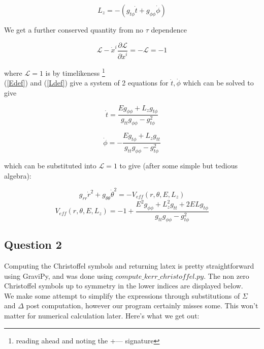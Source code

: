 \documentclass[10pt,a4paper]{report}
\begin{document}
\begin{equation}
L_z = - ( g_{t\phi}\dot{t}+g_{\phi\phi}\dot{\phi})
\label{Ldef}
\end{equation}

We get a further conserved quantity from no $\tau$ dependence

\begin{equation}
\mathcal{L} - \dot{x}^i \frac{\partial \mathcal{L}}{\partial \dot{x}^i} = -\mathcal{L} = -1
\label{Qdef}
\end{equation}

where $\mathcal{L} = 1$ is by timelikeness \footnote{reading ahead and noting the +--- signature} \\

(\ref{Edef}) and (\ref{Ldef}) give a system of 2 equations for $\dot{t}, \dot{\phi}$ which can be solved to give

\begin{equation}
\dot{t} = \frac{Eg_{\phi\phi}+L_zg_{t\phi}}{g_{tt}g_{\phi\phi}-g_{t\phi}^2}
\end{equation}

\begin{equation}
\dot{\phi} = -\frac{Eg_{t\phi}+L_zg_{tt}}{g_{tt}g_{\phi\phi}-g_{t\phi}^2}
\end{equation}

which can be substituted into $\mathcal{L}=1$  to give (after some simple but tedious algebra): 

\begin{equation}
g_{rr}\dot{r}^2+g_{\theta\theta}\dot{\theta}^2 = -V_{eff}(r, \theta, E, L_z)
\label{effpot}
\end{equation}
\begin{equation*}
V_{eff}(r, \theta, E, L_z) = -1 + \frac{E^2g_{\phi\phi} + L_z^2g_{tt} + 2ELg_{t\phi}}{g_{tt}g_{\phi\phi}-g_{t\phi}^2}
\end{equation*}

\subsection*{Question 2}
Computing the Christoffel symbols and returning latex is pretty straightforward using GraviPy, and was done using $compute\_kerr\_christoffel.py$. The non zero Christoffel symbols up to symmetry in the lower indices are displayed below. \\

We make some attempt to simplify the expressions through substitutions of $\Sigma$ and $\Delta$ post computation, however our program certainly misses some. This won't matter for numerical calculation later. Here's what we get out:
\end{document}

